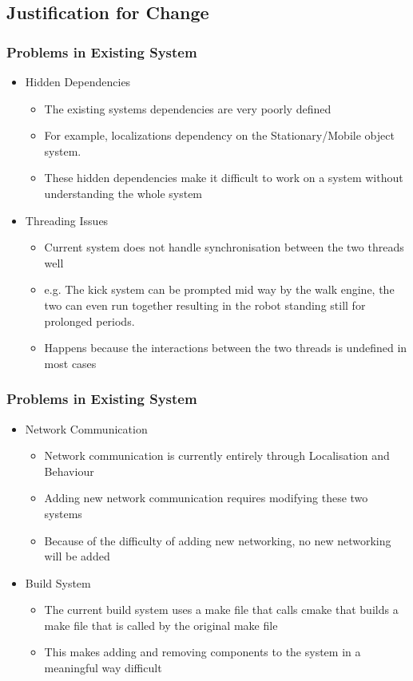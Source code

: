 \documentclass{beamer}
\begin{document}
\subsection{Justification for Change}
\begin{frame}
	\frametitle{Problems in Existing System}
	\begin{itemize}
		\item Hidden Dependencies
			\begin{itemize}
				\item The existing systems dependencies are very poorly defined
				\item For example, localizations dependency on the Stationary/Mobile object system.
				\item These hidden dependencies make it difficult to work on a system without understanding the whole system
			\end{itemize}

		\item Threading Issues
			\begin{itemize}
				\item Current system does not handle synchronisation between the two threads well
				\item e.g. The kick system can be prompted mid way by the walk engine, the two can even run together resulting in the robot standing still for prolonged periods.
				\item Happens because the interactions between the two threads is undefined in most cases
			\end{itemize}
	\end{itemize}
\end{frame}

\begin{frame}
	\frametitle{Problems in Existing System}
	\begin{itemize}
		\item Network Communication
			\begin{itemize}
				\item Network communication is currently entirely through Localisation and Behaviour
				\item Adding new network communication requires modifying these two systems
				\item Because of the difficulty of adding new networking, no new networking will be added
			\end{itemize}

		\item Build System
			\begin{itemize}
				\item The current build system uses a make file that calls cmake that builds a make file that is called by the original make file
				\item This makes adding and removing components to the system in a meaningful way difficult
			\end{itemize}
	\end{itemize}
\end{frame}
\end{document}
